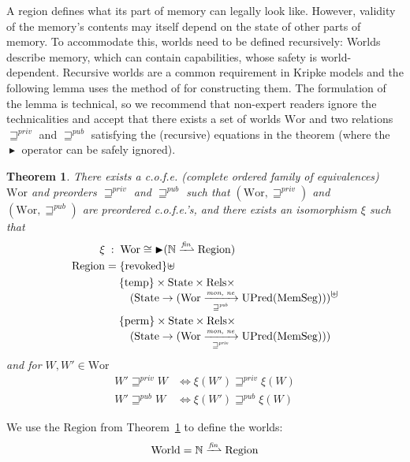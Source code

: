 \documentclass[compsoc,conference,letterpaper,fleqn]{IEEEtran}
\newtheorem{theorem}{Theorem}
\newcommand{\finparfun}{\xrightharpoonup{\textit{\tiny{fin}}}}
\newcommand{\fun}{\rightarrow}
\newcommand{\blater}{\mathop{\blacktriangleright}}
\newcommand{\cofe}{c.o.f.e.}
\newcommand{\cofes}{\cofe{}'s}
\newcommand\lau[1]{{\color{purple} \sf \footnotesize {LS: #1}}\\}
\newcommand\dominique[1]{{\color{purple} \sf \footnotesize {DD: #1}}\\}
\renewcommand\lau[1]{}
\renewcommand\dominique[1]{}
\newcommand{\var}[1]{\mathit{#1}}
\newcommand{\futurewk}{\mathbin{\sqsupseteq}^{\var{pub}}}
\newcommand{\futurestr}{\mathbin{\sqsupseteq}^{\var{priv}}}
\newcommand{\monwknefun}{\xrightarrow[\text{\tiny{$\futurewk$}}]{\textit{\tiny{mon, ne}}}}
\newcommand{\monstrnefun}{\xrightarrow[\text{\tiny{$\futurestr$}}]{\textit{\tiny{mon, ne}}}}
\newcommand{\plaindom}[1]{\mathrm{#1}}
\newcommand{\HeapSegments}{\plaindom{MemSeg}}
\newcommand{\nats}{\mathbb{N}}
\newcommand{\Rels}{\plaindom{Rels}}
\newcommand{\States}{\plaindom{State}}
\newcommand{\Regions}{\plaindom{Region}}
\newcommand{\Worlds}{\plaindom{World}}
\newcommand{\Wor}{\plaindom{Wor}}
\newcommand{\UPred}[1]{\plaindom{UPred}(#1)}
\newcommand{\plainview}[1]{\mathrm{#1}}
\newcommand{\perma}{\plainview{perm}}
\newcommand{\temp}{\plainview{temp}}
\newcommand{\revoked}{\plainview{revoked}}
\begin{document}
A region defines what its part of memory can legally look like. However,
validity of the memory's contents may itself depend on the state of other parts
of memory. To accommodate this, worlds need to be defined recursively: Worlds
describe memory, which can contain capabilities, whose safety is
world-dependent. Recursive worlds are a common requirement in Kripke models and
the following lemma uses the method of \citet{Birkedal:2011:SKM:1926385.1926401}
for constructing them. The formulation of the lemma is technical, so we
recommend that non-expert readers ignore the technicalities and accept that
there exists a set of worlds $\Wor$ and two relations $\futurestr$ and
$\futurewk$ satisfying the (recursive) equations in the theorem (where the
$\blater$ operator can be safely ignored).
\begin{theorem}\label{thm:world-existence}
  There exists a \cofe{} (complete ordered family of equivalences) $\Wor$ and preorders $\futurestr$ and
  $\futurewk$ such that $(\Wor,\futurestr)$ and $(\Wor,\futurewk)$ are
  preordered \cofes{}, and there exists an isomorphism $\xi$ such that
  \begin{align*}
      \xi &\; : \; \Wor \cong \blater (\nats \finparfun \Regions)\\
      \Regions & = \{\revoked\} \uplus \\
                 &\;\quad \begin{multlined}
                     \{\temp\} \times \States \times \Rels \times \\
                     (\States \fun (\Wor \monwknefun \UPred{\HeapSegments}))
                   \end{multlined} \uplus \\
                 &\;\quad \begin{multlined}
                     \{\perma\} \times \States \times \Rels \times \\
                     (\States \fun (\Wor \monstrnefun \UPred{\HeapSegments}))
                   \end{multlined}
    \end{align*}
  and for $W, W' \in \Wor$
  \begin{align*}
    W' \futurestr W & \Leftrightarrow \xi(W') \futurestr \xi(W)   \\
    W' \futurewk W & \Leftrightarrow \xi(W') \futurewk \xi(W)
  \end{align*}
\end{theorem}
We use the $\Regions$ from Theorem~\ref{thm:world-existence} to define
the worlds:
\[
  \Worlds = \nats \finparfun \Regions
\]
\end{document}
